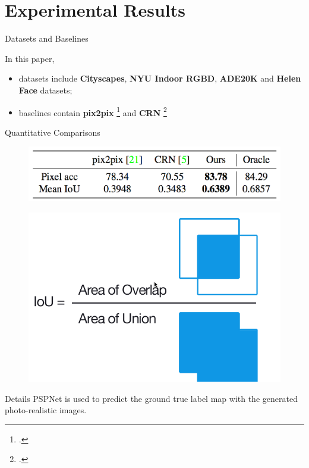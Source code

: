 \documentclass{beamer}
\begin{document}
\section{Experimental Results}
\begin{frame}{Datasets and Baselines}
%
%
\begin{beamerboxesrounded}[upper=uppercol,lower=lowercol,shadow=false]{In this paper, }
	\begin{itemize}
		\item
	datasets include \textbf{Cityscapes}, \textbf{NYU Indoor RGBD}, \textbf{ADE20K} and \textbf{Helen Face} datasets;
		\item
	baselines contain \textbf{pix2pix} \footcite{Image-to-image translation with conditional adversarial networks (CVPR 2017)} and \textbf{CRN} \footcite{Photographic image synthesis with cascaded refinement networks (ICCV 2017)}
	\end{itemize}
\end{beamerboxesrounded}
\end{frame}

\begin{frame}{Quantitative Comparisons }
\begin{figure}
	\centering
	\includegraphics[height=0.25\textheight]{images/table_1}
\end{figure}
\begin{figure}
	\centering
	\includegraphics[height=0.25\textheight]{images/IoU}
\end{figure}
%
%
\begin{beamerboxesrounded}[upper=uppercol,lower=lowercol,shadow=false]{Details }
 PSPNet is used  to predict the ground true label map with the generated photo-realistic images.
\end{beamerboxesrounded}

\end{frame}
\end{document}
